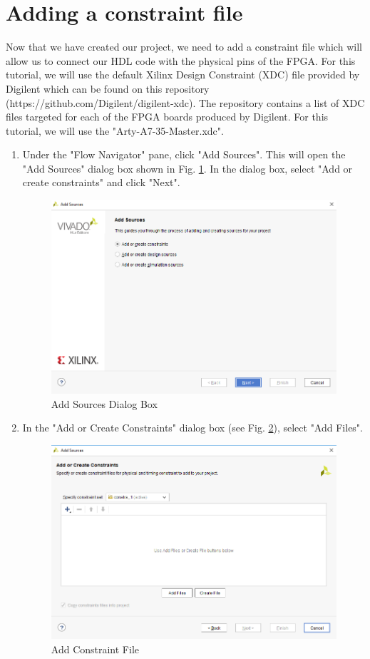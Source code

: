 \documentclass{article}
\begin{document}
\section*{Adding a constraint file}
  Now that we have created our project, we need to add a constraint file which will allow us to connect our HDL code with the physical pins 
  of the FPGA. For this tutorial, we will use the default Xilinx Design Constraint (XDC) file provided by Digilent which can be found on this repository
  (https://github.com/Digilent/digilent-xdc). The repository contains a list of XDC files targeted for each of the FPGA boards produced by Digilent. 
  For this tutorial, we will use the "Arty-A7-35-Master.xdc".
  \begin{enumerate}
    \item Under the "Flow Navigator" pane, click "Add Sources". This will open the "Add Sources" dialog box shown in Fig. \ref{fig:7-add_sources}.
    In the dialog box, select "Add or create constraints" and click "Next".
      \begin{figure}[h!]
        \centering
        \includegraphics[width=0.5\linewidth]{img/program/7-add_sources.png}
        \caption{Add Sources Dialog Box}
        \label{fig:7-add_sources}
      \end{figure}

    \item In the "Add or Create Constraints" dialog box (see Fig. \ref{fig:8-add_constraint}), select "Add Files".
      \begin{figure}[h!]
        \centering
        \includegraphics[width=0.5\linewidth]{img/program/8-add_constraint.png}
        \caption{Add Constraint File}
        \label{fig:8-add_constraint}
      \end{figure}


\end{enumerate}
\end{document}
